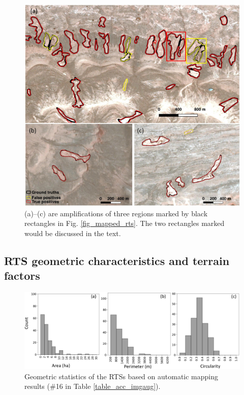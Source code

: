 \documentclass[preprint,12pt,authoryear]{elsarticle}
\begin{document}
\begin{figure}
	\centering
	\includegraphics[width=12cm]{figures/zoom_in_mapped_polygons_trim.jpg}
	\caption{(a)–(c) are amplifications of three regions marked by black rectangles in Fig. \ref{fig_mapped_rts}. The two rectangles marked would be discussed in the text.}
	\label{fig_zoomin_mapped_rts}
\end{figure}

\subsection{RTS geometric characteristics and terrain factors}
\label{subsub_chara_terrain}

\begin{figure}
	\centering
	\includegraphics[width=14cm]{figures/geometric_var_mapped_trim.jpg}
	\caption{Geometric statistics of the RTSs based on automatic mapping results (\#16 in Table \ref{table_acc_imgaug}). }
	\label{fig_geometric_statistics}
\end{figure}
\end{document}
